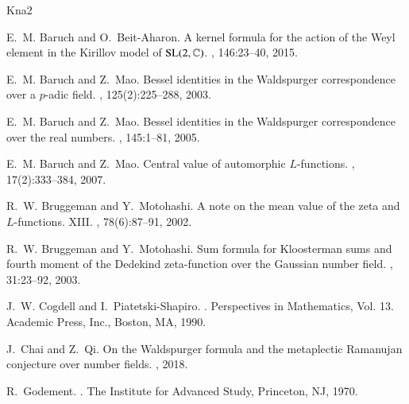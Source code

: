 \documentclass{amsproc}
\theoremstyle{plain}
\numberwithin{equation}{section}
\begin{document}
	
	
	
%	
%	

\def\cprime{$'$} \def\cprime{$'$}
\begin{thebibliography}{Kna2}
	
	E.~M. Baruch and O.~Beit-Aharon.
	\newblock A kernel formula for the action of the {W}eyl element in the
	{K}irillov model of {$\mathrm{SL}(2,\Bbb{C})$}.
	, 146:23--40, 2015.
	
	E.~M. Baruch and Z.~Mao.
	\newblock Bessel identities in the {W}aldspurger correspondence over a
	{$p$}-adic field.
	, 125(2):225--288, 2003.
	
	E.~M. Baruch and Z.~Mao.
	\newblock Bessel identities in the {W}aldspurger correspondence over the real
	numbers.
	, 145:1--81, 2005.
	
	E.~M. Baruch and Z.~Mao.
	\newblock Central value of automorphic {$L$}-functions.
	, 17(2):333--384, 2007.
	
	R.~W. Bruggeman and Y.~Motohashi.
	\newblock A note on the mean value of the zeta and {$L$}-functions. {XIII}.
	, 78(6):87--91, 2002.
	
	R.~W. Bruggeman and Y.~Motohashi.
	\newblock Sum formula for {K}loosterman sums and fourth moment of the
	{D}edekind zeta-function over the {G}aussian number field.
	, 31:23--92, 2003.
	
	J.~W. Cogdell and I.~Piatetski-Shapiro.
	.
	\newblock Perspectives in Mathematics, Vol. 13. Academic Press, Inc., Boston,
	MA, 1990.
	
	
	J.~Chai and Z.~Qi.
	\newblock On the {W}aldspurger formula and the metaplectic {R}amanujan
	conjecture over number fields.
	, 2018.
	
	
	R.~Godement.
	.
	\newblock The Institute for Advanced Study, Princeton, NJ, 1970.
	

\end{thebibliography}
\end{document}
